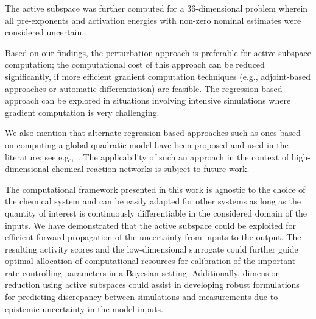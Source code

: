 The active subspace was further computed for a 36-dimensional problem
wherein all pre-exponents and activation energies with non-zero nominal
estimates  were considered uncertain. 

Based on our findings, the perturbation approach is preferable for active
subspace computation; the computational cost of this approach can be reduced
significantly, if more efficient gradient computation techniques (e.g.,
adjoint-based approaches or automatic differentiation) are feasible. The
regression-based approach can be explored in situations involving intensive
simulations where gradient computation is very challenging. 

%
%
We also mention that alternate regression-based approaches such as ones based
on computing a global quadratic model have been proposed and used in the
literature; see e.g.,~\cite{Constantine:2017a}.  The applicability of such an
approach in the context of high-dimensional chemical reaction networks is
subject to future work. 

The computational framework presented in this work is agnostic to the choice of
the chemical system and can be easily adapted for other systems as long as the
quantity of interest is continuously differentiable in the considered domain of
the inputs.  We have demonstrated that the active subspace could be exploited
for efficient forward propagation of the uncertainty from inputs to the output.
The resulting activity scores and the low-dimensional surrogate could further
guide optimal allocation of computational resources for calibration of the
important rate-controlling parameters  in a
Bayesian setting.  Additionally, dimension reduction using active subspaces
could assist in developing robust formulations for predicting discrepancy
between simulations and measurements due to epistemic uncertainty in the model
inputs.

